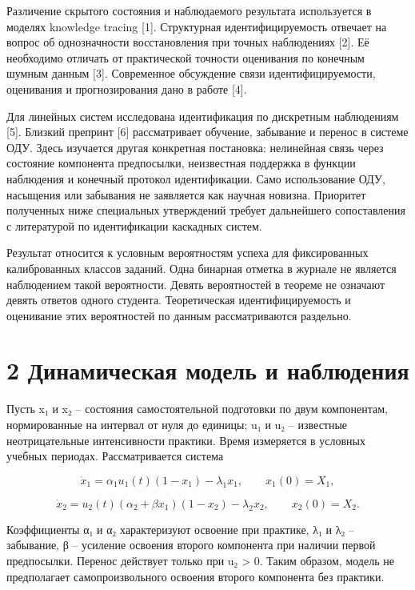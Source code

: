 \documentclass[11pt,a4paper]{article}
\begin{document}
Различение скрытого состояния и наблюдаемого результата используется в моделях knowledge tracing [1]. Структурная идентифицируемость отвечает на вопрос об однозначности восстановления при точных наблюдениях [2]. Её необходимо отличать от практической точности оценивания по конечным шумным данным [3]. Современное обсуждение связи идентифицируемости, оценивания и прогнозирования дано в работе [4].\par

Для линейных систем исследована идентификация по дискретным наблюдениям [5]. Близкий препринт [6] рассматривает обучение, забывание и перенос в системе ОДУ. Здесь изучается другая конкретная постановка: нелинейная связь через состояние компонента предпосылки, неизвестная поддержка в функции наблюдения и конечный протокол идентификации. Само использование ОДУ, насыщения или забывания не заявляется как научная новизна. Приоритет полученных ниже специальных утверждений требует дальнейшего сопоставления с литературой по идентификации каскадных систем.\par

Результат относится к условным вероятностям успеха для фиксированных калиброванных классов заданий. Одна бинарная отметка в журнале не является наблюдением такой вероятности. Девять вероятностей в теореме не означают девять ответов одного студента. Теоретическая идентифицируемость и оценивание этих вероятностей по данным рассматриваются раздельно.\par

\section*{2 Динамическая модель и наблюдения}

Пусть x₁ и x₂ – состояния самостоятельной подготовки по двум компонентам, нормированные на интервал от нуля до единицы; u₁ и u₂ – известные неотрицательные интенсивности практики. Время измеряется в условных учебных периодах. Рассматривается система\par

\begin{equation}\dot x_1=\alpha_1u_1(t)(1-x_1)-\lambda_1x_1,\qquad x_1(0)=X_1,\end{equation}

\begin{equation}\dot x_2=u_2(t)(\alpha_2+\beta x_1)(1-x_2)-\lambda_2x_2,\qquad x_2(0)=X_2.\end{equation}

Коэффициенты α₁ и α₂ характеризуют освоение при практике, λ₁ и λ₂ – забывание, β – усиление освоения второго компонента при наличии первой предпосылки. Перенос действует только при u₂ > 0. Таким образом, модель не предполагает самопроизвольного освоения второго компонента без практики.\par
\end{document}
